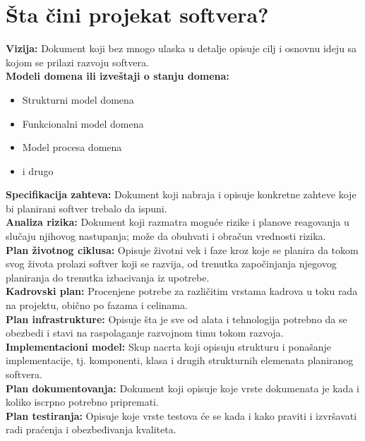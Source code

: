 \documentclass[a4paper]{article}
\begin{document}
\section{Šta čini projekat softvera?}
\textbf{Vizija:} Dokument koji bez mnogo ulaska u detalje opisuje cilj i osnovnu ideju sa kojom se prilazi razvoju softvera.\\

\textbf{Modeli domena ili izveštaji o stanju domena:}
\begin{itemize}
  \item Strukturni model domena
  \item Funkcionalni model domena
  \item Model procesa domena
  \item i drugo\\
\end{itemize}

\textbf{Specifikacija zahteva:} Dokument koji nabraja i opisuje konkretne zahteve koje bi planirani softver trebalo da ispuni.\\

\textbf{Analiza rizika:} Dokument koji razmatra moguće rizike i planove reagovanja u slučaju njihovog nastupanja; može da obuhvati i obračun vrednosti rizika.\\

\textbf{Plan životnog ciklusa:} Opisuje životni vek i faze kroz koje se planira da tokom svog života prolazi softver koji se razvija, od trenutka započinjanja njegovog planiranja do trenutka izbacivanja iz upotrebe.\\

\textbf{Kadrovski plan:} Procenjene potrebe za različitim vrstama kadrova u toku rada na projektu, obično po fazama i celinama.\\

\textbf{Plan infrastrukture:} Opisuje šta je sve od alata i tehnologija potrebno da se obezbedi i stavi na raspolaganje razvojnom timu tokom razvoja.\\

\textbf{Implementacioni model:} Skup nacrta koji opisuju strukturu i ponašanje implementacije, tj. komponenti, klasa i drugih strukturnih elemenata planiranog softvera.\\

\textbf{Plan dokumentovanja:} Dokument koji opisuje koje vrste dokumenata je kada i koliko iscrpno potrebno pripremati.\\

\textbf{Plan testiranja:} Opisuje koje vrste testova će se kada i kako praviti i izvršavati radi praćenja i obezbeđivanja kvaliteta.
\end{document}
